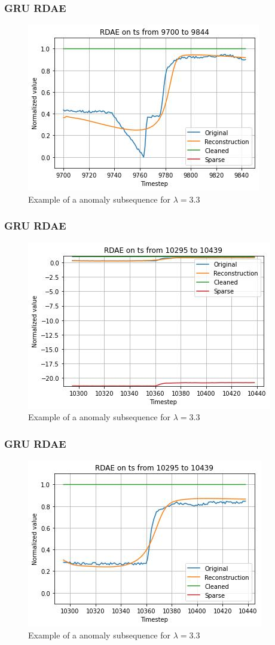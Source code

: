 \documentclass{beamer}
\theoremstyle{plain}
\theoremstyle{definition}
\theoremstyle{remark}
\begin{document}
\begin{frame}
	\frametitle{GRU RDAE}
	\begin{figure}
		\centering
		\includegraphics[width=0.7\linewidth]{Images/GRUlam3.3ts_anomalyzoom9700.jpg}
		\caption[]{Example of a anomaly subsequence for $\lambda=3.3$}
	\end{figure}
\end{frame}

\begin{frame}
	\frametitle{GRU RDAE}
	\begin{figure}
		\centering
		\includegraphics[width=0.7\linewidth]{Images/GRUlam3.3ts_anomaly10295.jpg}
		\caption[]{Example of a anomaly subsequence for $\lambda=3.3$}
	\end{figure}
\end{frame}

\begin{frame}
	\frametitle{GRU RDAE}
	\begin{figure}
		\centering
		\includegraphics[width=0.7\linewidth]{Images/GRUlam3.3ts_anomalyzoom10295.jpg}
		\caption[]{Example of a anomaly subsequence for $\lambda=3.3$}
	\end{figure}
\end{frame}
\end{document}
